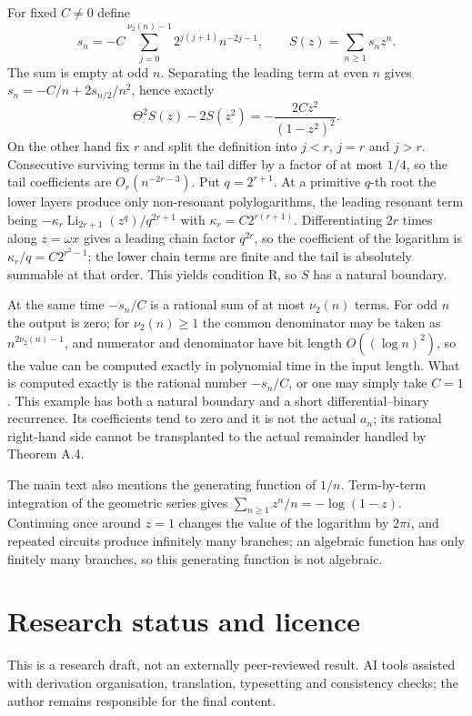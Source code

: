 \documentclass[11pt]{article}
\begin{document}
For fixed $C\ne0$ define
\[
s_n=-C\sum_{j=0}^{\nu_2(n)-1}2^{j(j+1)}n^{-2j-1},\qquad S(z)=\sum_{n\ge1}s_nz^n.
\]
The sum is empty at odd $n$. Separating the leading term at even $n$ gives $s_n=-C/n+2s_{n/2}/n^2$, hence exactly
\[
\Theta^2S(z)-2S(z^2)=-\frac{2Cz^2}{(1-z^2)^2}.
\]
On the other hand fix $r$ and split the definition into $j<r$, $j=r$ and $j>r$. Consecutive surviving terms in the tail differ by a factor of at most $1/4$, so the tail coefficients are $O_r(n^{-2r-3})$. Put $q=2^{r+1}$. At a primitive $q$-th root the lower layers produce only non-resonant polylogarithms, the leading resonant term being $-\kappa_r\operatorname{Li}_{2r+1}(z^q)/q^{2r+1}$ with $\kappa_r=C2^{r(r+1)}$. Differentiating $2r$ times along $z=\omega x$ gives a leading chain factor $q^{2r}$, so the coefficient of the logarithm is $\kappa_r/q=C2^{r^2-1}$; the lower chain terms are finite and the tail is absolutely summable at that order. This yields condition R, so $S$ has a natural boundary.

At the same time $-s_n/C$ is a rational sum of at most $\nu_2(n)$ terms. For odd $n$ the output is zero; for $\nu_2(n)\ge1$ the common denominator may be taken as $n^{2\nu_2(n)-1}$, and numerator and denominator have bit length $O((\log n)^2)$, so the value can be computed exactly in polynomial time in the input length. What is computed exactly is the rational number $-s_n/C$, or one may simply take $C=1$. This example has both a natural boundary and a short differential--binary recurrence. Its coefficients tend to zero and it is not the actual $a_n$; its rational right-hand side cannot be transplanted to the actual remainder handled by Theorem A.4.

The main text also mentions the generating function of $1/n$. Term-by-term integration of the geometric series gives $\sum_{n\ge1}z^n/n=-\log(1-z)$. Continuing once around $z=1$ changes the value of the logarithm by $2\pi i$, and repeated circuits produce infinitely many branches; an algebraic function has only finitely many branches, so this generating function is not algebraic.

\section*{Research status and licence}
This is a research draft, not an externally peer-reviewed result. AI tools assisted with derivation organisation, translation, typesetting and consistency checks; the author remains responsible for the final content.
\end{document}
